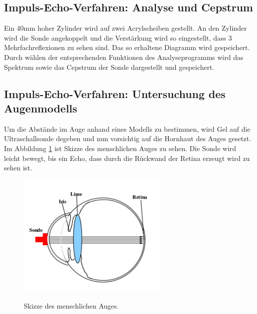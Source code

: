 \subsection{Impuls-Echo-Verfahren: Analyse und Cepstrum}
Ein 40\;mm hoher Zylinder wird auf zwei Acrylscheiben gestellt. An den
Zylinder wird die Sonde angekoppelt und die Verstärkung wird so eingestellt, dass
3 Mehrfachreflexionen zu sehen sind. Das so erhaltene Diagramm wird
gespeichert. Durch wählen der entsprechenden Funktionen des
Analyseprogramms wird das Spektrum sowie das Cepstrum der Sonde dargestellt
und gespeichert.

\subsection{Impuls-Echo-Verfahren: Untersuchung des Augenmodells}
Um die Abstände im Auge anhand eines Modells zu bestimmen, wird Gel auf die
Ultraschallsonde degeben und nun vorsichtig auf die Hornhaut des
Auges gesetzt. Im Abbildung \ref{fig:auge} ist Skizze des menschlichen
Auges zu sehen. Die Sonde wird leicht bewegt, bis ein Echo, dass durch
die Rückwand der Retina erzeugt wird zu sehen ist.

\begin{figure}[H]
  \centering
  \includegraphics[height=6cm]{auge.png}
  \caption{Skizze des menschlichen Auges.}
  \label{fig:auge}
  \cite{skript}
\end{figure}
